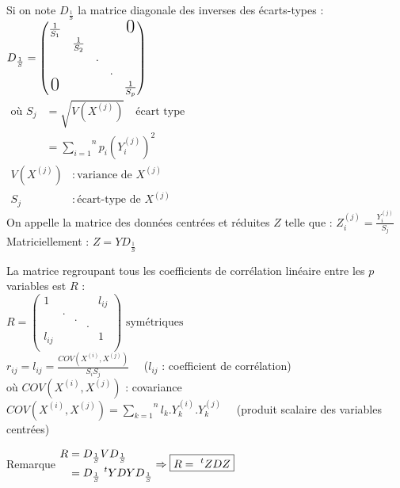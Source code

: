 \documentclass[a4paper, 12pt]{article}
\begin{document}
\begin{flushleft}
Si on note $D_{\frac{1}{S}}$ la matrice diagonale des inverses des écarts-types : \\
$
D_{\frac{1}{S}} =
\begin{pmatrix}
\frac{1}{S_1} & & & & \text{\LARGE 0} \\
& \frac{1}{S_2} & & & \\
& & . & & \\
& & & . &\\
\text{\LARGE 0} & & & & \frac{1}{S_p}\\
\end{pmatrix}
$ \\
\medskip
$
\begin{aligned}
\text{où } S_j &= \sqrt{V(X^{(j)})} \quad \text{écart type} \\
&= \overset{n}{\underset{i = 1}{\sum}} p_i \left (Y^{(j)}_i \right )^2
\end{aligned}
$ \\
\medskip
$
\begin{aligned}
V(X^{(j)}) &: \text{variance de } X^{(j)} \\
S_j &: \text{écart-type de } X^{(j)}
\end{aligned}
$ \\
\medskip
On appelle la matrice des données centrées et réduites $Z$ telle que : $\boxed{Z^{(j)}_i = \frac{Y^{(j)}_i}{S_j}}$ \\
\medskip
Matriciellement : $\boxed{Z = YD_{\frac{1}{S}}}$

La matrice regroupant tous les coefficients de corrélation linéaire entre les $p$ variables est $R$ : \\
$
R = 
\begin{pmatrix}
1 & & & & l_{ij} \\
& . & & & \\
& & . & & \\
& & & . & \\
l_{ij} & & & & 1 \\
\end{pmatrix}
\text{ symétriques}
$ \\
\medskip
$r_{ij} = l_{ij} = \frac{COV (X^{(i)}, X^{(j)})}{S_i S_j} \quad$ ($l_{ij}$ : coefficient de corrélation) \\
où $COV (X^{(i)}, X^{(j)})$ : covariance \\
$COV (X^{(i)}, X^{(j)}) = \overset{n}{\underset{k = 1}{\sum}} l_k . Y^{(i)}_k . Y^{(j)}_k \quad$ (produit scalaire des variables centrées) \\

\begin{remarque}{Remarque}
$
\begin{aligned}
R &= D_{\frac{1}{S}} V D_{\frac{1}{S}} \\
&= D_{\frac{1}{S}} \ ^tYDY D_{\frac{1}{S}}
\end{aligned} \\
\Rightarrow \boxed{R = \ ^tZDZ}
$
\end{remarque}
\end{flushleft}
\end{document}
